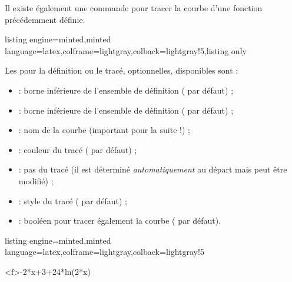 \documentclass[11pt,a4paper]{ltxdoc}
\begin{document}
\smallskip

Il existe également une commande pour tracer la courbe d'une fonction précédemment définie.

\begin{tcblisting}{listing engine=minted,minted language=latex,colframe=lightgray,colback=lightgray!5,listing only}
\end{tcblisting}

Les \MontreCode{[clés]} pour la définition ou le tracé, optionnelles, disponibles sont :

\smallskip

\begin{itemize}
	\item {} : borne inférieure de l'ensemble de définition ( par défaut) ;
	\item {} : borne inférieure de l'ensemble de définition ( par défaut) ;
	\item {} : nom de la courbe (important pour la suite !) ;
	\item {} : couleur du tracé ( par défaut) ;
	\item {} : pas du tracé (il est déterminé \textit{automatiquement} au départ mais peut être modifié) ;
	\item {} : style du tracé ( par défaut) ;
	\item {} : booléen pour tracer également la courbe ( par défaut).
\end{itemize}

\begin{tcblisting}{listing engine=minted,minted language=latex,colframe=lightgray,colback=lightgray!5}
\begin{GraphiqueTikz}%
	[x=0.9cm,y=0.425cm,Xmin=4,Xmax=20,Origx=4,
	Ymin=40,Ymax=56,Ygrille=2,Ygrilles=1,Origy=40]
	{-2*x+3+24*ln(2*x)}
\end{GraphiqueTikz}
\end{tcblisting}
\end{document}
